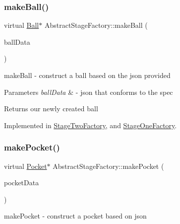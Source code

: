 \subsubsection{\texorpdfstring{make\+Ball()}{makeBall()}}
{\footnotesize\ttfamily virtual \mbox{\hyperlink{class_ball}{Ball}}$\ast$ Abstract\+Stage\+Factory\+::make\+Ball (\begin{DoxyParamCaption}\item[{const Q\+Json\+Object \&}]{ball\+Data }\end{DoxyParamCaption})\hspace{0.3cm}{\ttfamily [pure virtual]}}



make\+Ball -\/ construct a ball based on the json provided 


\begin{DoxyParams}{Parameters}
{\em ball\+Data} & -\/ json that conforms to the spec \\
\hline
\end{DoxyParams}
\begin{DoxyReturn}{Returns}
our newly created ball 
\end{DoxyReturn}


Implemented in \mbox{\hyperlink{class_stage_two_factory_aa12e02122eea28b08b3e148521bc2055}{Stage\+Two\+Factory}}, and \mbox{\hyperlink{class_stage_one_factory_a8a89031bc805b70d93e942275777394d}{Stage\+One\+Factory}}.

\mbox{\label{class_abstract_stage_factory_a6ce57859e00b135049e3b995b7dfc94d}} 
\subsubsection{\texorpdfstring{make\+Pocket()}{makePocket()}}
{\footnotesize\ttfamily virtual \mbox{\hyperlink{class_pocket}{Pocket}}$\ast$ Abstract\+Stage\+Factory\+::make\+Pocket (\begin{DoxyParamCaption}\item[{const Q\+Json\+Object \&}]{pocket\+Data }\end{DoxyParamCaption})\hspace{0.3cm}{\ttfamily [pure virtual]}}



make\+Pocket -\/ construct a pocket based on json 



